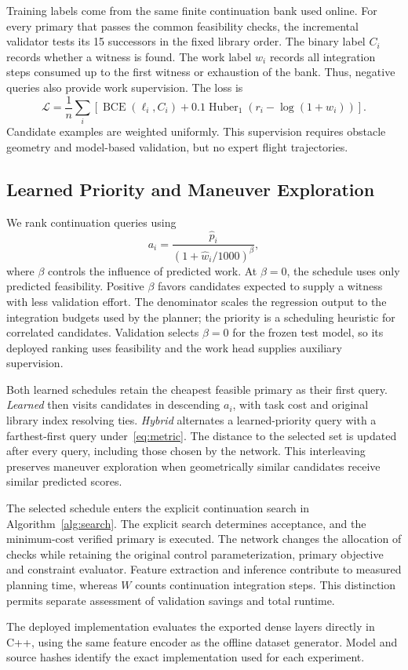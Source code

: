 Training labels come from the same finite continuation bank used online. For every primary that passes the common feasibility checks, the incremental validator tests its 15 successors in the fixed library order. The binary label $C_i$ records whether a witness is found. The work label $w_i$ records all integration steps consumed up to the first witness or exhaustion of the bank. Thus, negative queries also provide work supervision. The loss is
\begin{equation}
 \mathcal L=\frac{1}{n}\sum_i\left[
 \operatorname{BCE}(\ell_i,C_i)
 +0.1\operatorname{Huber}_1(r_i-\log(1+w_i))\right].
 \label{eq:learning_loss}
\end{equation}
Candidate examples are weighted uniformly. This supervision requires obstacle geometry and model-based validation, but no expert flight trajectories.

\subsection{Learned Priority and Maneuver Exploration}
We rank continuation queries using
\begin{equation}
 a_i=\frac{\hat p_i}{(1+\hat w_i/1000)^\beta}, \label{eq:priority}
\end{equation}
where $\beta$ controls the influence of predicted work. At $\beta=0$, the schedule uses only predicted feasibility. Positive $\beta$ favors candidates expected to supply a witness with less validation effort. The denominator scales the regression output to the integration budgets used by the planner; the priority is a scheduling heuristic for correlated candidates. Validation selects $\beta=0$ for the frozen test model, so its deployed ranking uses feasibility and the work head supplies auxiliary supervision.

Both learned schedules retain the cheapest feasible primary as their first query. \emph{Learned} then visits candidates in descending $a_i$, with task cost and original library index resolving ties. \emph{Hybrid} alternates a learned-priority query with a farthest-first query under~\eqref{eq:metric}. The distance to the selected set is updated after every query, including those chosen by the network. This interleaving preserves maneuver exploration when geometrically similar candidates receive similar predicted scores.

The selected schedule enters the explicit continuation search in Algorithm~\ref{alg:search}. The explicit search determines acceptance, and the minimum-cost verified primary is executed. The network changes the allocation of checks while retaining the original control parameterization, primary objective and constraint evaluator. Feature extraction and inference contribute to measured planning time, whereas $W$ counts continuation integration steps. This distinction permits separate assessment of validation savings and total runtime.

The deployed implementation evaluates the exported dense layers directly in C++, using the same feature encoder as the offline dataset generator. Model and source hashes identify the exact implementation used for each experiment.
